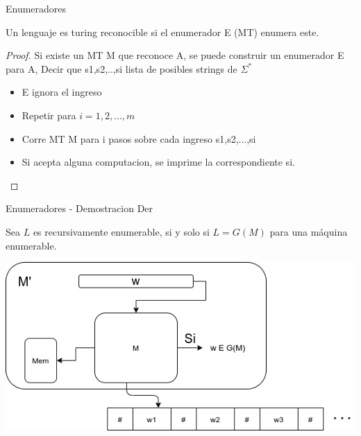 \documentclass[11pt]{beamer}
\begin{document}
		\begin{frame}{Enumeradores}
			\justifying
            \justifying
	        \begin{theorem}
                Un lenguaje es turing reconocible si el enumerador E (MT) enumera este.
            \end{theorem}
            \begin{proof}
                    Si existe un MT M que reconoce A, se puede construir un enumerador E para A, Decir que s1,s2,..,si lista de posibles strings de $\Sigma^{*}$
                    \begin{itemize}
                        \item E ignora el ingreso
                        \item Repetir para $i=1,2,...,m$
                        \item Corre MT M para i pasos sobre cada ingreso s1,s2,...,si
                        \item Si acepta alguna computacion, se imprime la correspondiente si.
                    \end{itemize}
            \end{proof}
		\end{frame}
		
		
		
		\begin{frame}{Enumeradores  - Demostracion Der}
			\justifying
	        \begin{theorem}
                Sea $L$ es recursivamente enumerable, si y solo si  $L = G(M)$ para una máquina enumerable. 
            \end{theorem}
            \begin{center}
            \includegraphics[scale=0.5]{img/teo1_b.png}
			\end{center}
		\end{frame}
		
\end{document}
